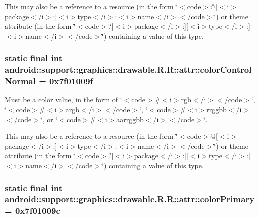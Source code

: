 This may also be a reference to a resource (in the form \char`\"{}$<$code$>$@\mbox{[}$<$i$>$package$<$/i$>$:\mbox{]}$<$i$>$type$<$/i$>$:$<$i$>$name$<$/i$>$$<$/code$>$\char`\"{}) or theme attribute (in the form \char`\"{}$<$code$>$?\mbox{[}$<$i$>$package$<$/i$>$:\mbox{]}\mbox{[}$<$i$>$type$<$/i$>$:\mbox{]}$<$i$>$name$<$/i$>$$<$/code$>$\char`\"{}) containing a value of this type. \hypertarget{classandroid_1_1support_1_1graphics_1_1drawable_1_1_r_1_1attr_b6d4ab73db1831ee2eedf2e03e895ee1}{
\subsubsection[{colorControlNormal}]{\setlength{\rightskip}{0pt plus 5cm}static final int android::support::graphics::drawable.R.R::attr::colorControlNormal = 0x7f01009f}}
\label{classandroid_1_1support_1_1graphics_1_1drawable_1_1_r_1_1attr_b6d4ab73db1831ee2eedf2e03e895ee1}


Must be a \hyperlink{classandroid_1_1support_1_1graphics_1_1drawable_1_1_r_1_1color}{color} value, in the form of \char`\"{}$<$code$>$\#$<$i$>$rgb$<$/i$>$$<$/code$>$\char`\"{}, \char`\"{}$<$code$>$\#$<$i$>$argb$<$/i$>$$<$/code$>$\char`\"{}, \char`\"{}$<$code$>$\#$<$i$>$rrggbb$<$/i$>$$<$/code$>$\char`\"{}, or \char`\"{}$<$code$>$\#$<$i$>$aarrggbb$<$/i$>$$<$/code$>$\char`\"{}. 

This may also be a reference to a resource (in the form \char`\"{}$<$code$>$@\mbox{[}$<$i$>$package$<$/i$>$:\mbox{]}$<$i$>$type$<$/i$>$:$<$i$>$name$<$/i$>$$<$/code$>$\char`\"{}) or theme attribute (in the form \char`\"{}$<$code$>$?\mbox{[}$<$i$>$package$<$/i$>$:\mbox{]}\mbox{[}$<$i$>$type$<$/i$>$:\mbox{]}$<$i$>$name$<$/i$>$$<$/code$>$\char`\"{}) containing a value of this type. \hypertarget{classandroid_1_1support_1_1graphics_1_1drawable_1_1_r_1_1attr_b9425e828c8da7545fc691bbdcad548a}{
\subsubsection[{colorPrimary}]{\setlength{\rightskip}{0pt plus 5cm}static final int android::support::graphics::drawable.R.R::attr::colorPrimary = 0x7f01009c}}
\label{classandroid_1_1support_1_1graphics_1_1drawable_1_1_r_1_1attr_b9425e828c8da7545fc691bbdcad548a}


